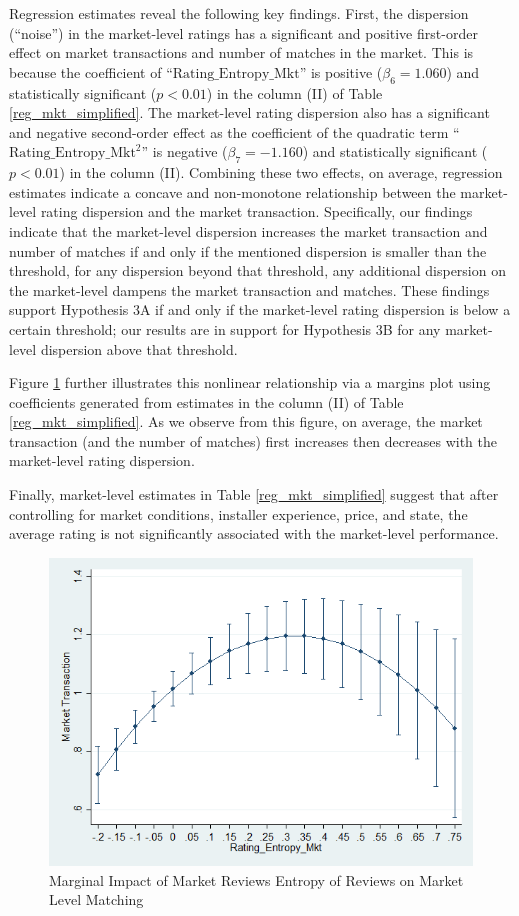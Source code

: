 \documentclass[msom,blindrev]{informs3}
\begin{document}
	
	
	Regression estimates reveal the following key findings. First, the dispersion (``noise'') in the market-level ratings has a significant and positive first-order effect on market transactions and number of matches in the market. This is because the coefficient of ``$\text{Rating\_Entropy\_Mkt}$'' is positive ($\beta_{6}=1.060$) and statistically significant ($p<0.01$) in the column (II) of Table \ref{reg_mkt_simplified}. The market-level rating dispersion also has a significant and negative second-order effect as the coefficient of the quadratic term ``$\text{Rating\_Entropy\_Mkt}^2$'' is negative ($\beta_{7}=-1.160$) and statistically significant ($p<0.01$) in the column (II). Combining these two effects, on average, regression estimates indicate a concave and non-monotone relationship between the market-level rating dispersion and the market transaction.  Specifically, our findings indicate that the market-level dispersion increases the market transaction and number of matches if and only if the mentioned dispersion is smaller than the threshold, for any dispersion beyond that threshold, any additional dispersion on the market-level dampens the market transaction and matches. These findings support Hypothesis 3A if and only if the market-level rating dispersion is below a certain threshold; our results are in support for Hypothesis 3B for any market-level dispersion above that threshold.
	
	Figure \ref{fig: marginsplot_mkt_entmkt} further illustrates this nonlinear relationship via a margins plot using coefficients generated from estimates in the column (II) of Table \ref{reg_mkt_simplified}. As we observe from this figure, on average, the market transaction (and the number of matches) first increases then decreases with the market-level rating dispersion.
	
	Finally, market-level estimates in Table \ref{reg_mkt_simplified} suggest that after controlling for market conditions, installer experience, price, and state, the average rating is not significantly associated with the market-level performance.
	\begin{figure}
		\centering
		\includegraphics[width=0.7\linewidth]{marginsplot_entmkt.png}
		\caption{Marginal Impact of Market Reviews Entropy of Reviews on Market Level Matching}
		\label{fig: marginsplot_mkt_entmkt}
	\end{figure}
	
\end{document}
